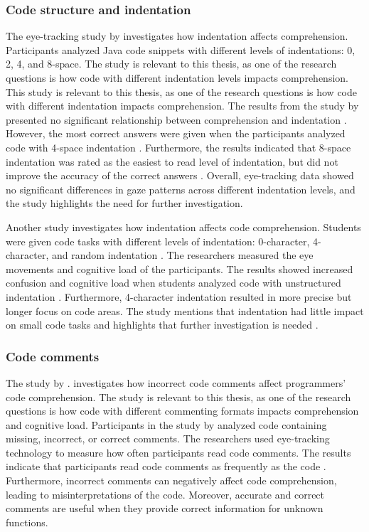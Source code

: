 \subsubsection{Code structure and indentation} 


The eye-tracking study by \citet{bauer2017indentations} investigates how indentation affects comprehension. Participants analyzed Java code snippets with different levels of indentations: 0, 2, 4, and 8-space. The study is relevant to this thesis, as one of the research questions is how code with different  indentation levels impacts comprehension. This study is relevant to this thesis, as one of the research questions is how code with different indentation impacts comprehension. The results from the study by \citet{bauer2017indentations} presented no significant relationship between comprehension and indentation \citet{bauer2017indentations}. However, the most correct answers were given when the participants analyzed code with 4-space indentation . Furthermore, the results indicated that 8-space indentation was rated as the easiest to read level of indentation, but did not improve the accuracy of the correct answers \citet{bauer2017indentations}. Overall, eye-tracking data showed no significant differences in gaze patterns across different indentation levels, and the study highlights the need for further investigation. 



Another study \citet{yorimoto2024quantitative} investigates how indentation affects code comprehension. Students were given code tasks with different levels of indentation: 0-character, 4-character, and random indentation \citet{yorimoto2024quantitative}. The researchers measured the eye movements and cognitive load of the participants. The results showed increased confusion and cognitive load when students analyzed code with unstructured indentation \citet{yorimoto2024quantitative}. Furthermore, 4-character indentation resulted in more precise but longer focus on code areas. The study mentions that indentation had little impact on small code tasks and highlights that further investigation is needed \citet{yorimoto2024quantitative}.   
\subsubsection{Code comments} 

The study by  \citet{bakhuizen2019comments}. investigates how incorrect code comments affect programmers' code comprehension. The study is relevant to this thesis, as one of the research questions is how code with different  commenting formats impacts comprehension and cognitive load.  Participants in the study by  \citet{bakhuizen2019comments} analyzed code containing missing, incorrect, or correct comments.
The researchers used eye-tracking technology to measure how often participants read code comments. The results indicate that participants read code comments as frequently as the code \citet{bakhuizen2019comments}. Furthermore, incorrect comments can negatively affect code comprehension, leading to misinterpretations of the code. Moreover, accurate and correct comments are useful when they provide correct information for unknown functions. 

